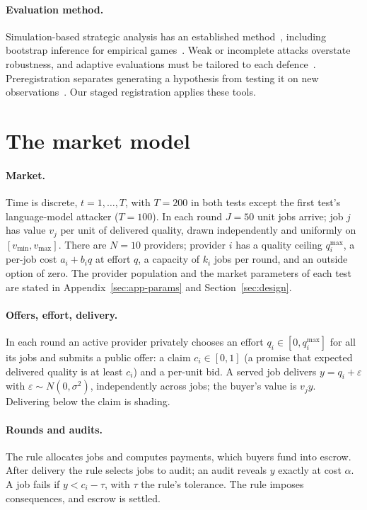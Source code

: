 \documentclass[11pt]{article}
\begin{document}
\paragraph{Evaluation method.} Simulation-based strategic analysis has an established method~\cite{wellman2006methods,wellman2025egta}, including bootstrap inference for empirical games~\cite{wiedenbeck2014bootstrap}. Weak or incomplete attacks overstate robustness, and adaptive evaluations must be tailored to each defence~\cite{carlini2019evaluating,tramer2020adaptive}. Preregistration separates generating a hypothesis from testing it on new observations~\cite{nosek2018preregistration}. Our staged registration applies these tools.

\section{The market model}\label{sec:model}
\paragraph{Market.} Time is discrete, $t = 1, \dots, T$, with $T = 200$ in both tests except the first test's language-model attacker ($T = 100$). In each round $J = 50$ unit jobs arrive; job $j$ has value $v_j$ per unit of delivered quality, drawn independently and uniformly on $[v_{\min}, v_{\max}]$. There are $N = 10$ providers; provider $i$ has a quality ceiling $q^{\max}_i$, a per-job cost $a_i + b_i q$ at effort $q$, a capacity of $k_i$ jobs per round, and an outside option of zero. The provider population and the market parameters of each test are stated in Appendix~\ref{sec:app-params} and Section~\ref{sec:design}.

\paragraph{Offers, effort, delivery.} In each round an active provider privately chooses an effort $q_i \in [0, q^{\max}_i]$ for all its jobs and submits a public offer: a claim $c_i \in [0,1]$ (a promise that expected delivered quality is at least $c_i$) and a per-unit bid. A served job delivers $y = q_i + \varepsilon$ with $\varepsilon \sim N(0,\sigma^2)$, independently across jobs; the buyer's value is $v_j y$. Delivering below the claim is shading.

\paragraph{Rounds and audits.} The rule allocates jobs and computes payments, which buyers fund into escrow. After delivery the rule selects jobs to audit; an audit reveals $y$ exactly at cost $\alpha$. A job fails if $y < c_i - \tau$, with $\tau$ the rule's tolerance. The rule imposes consequences, and escrow is settled.
\end{document}
